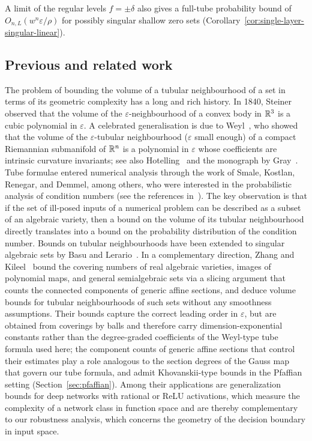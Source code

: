 A limit of the regular levels $f=\pm\delta$ also gives a full-tube probability bound of $O_{n,L}(w^n\varepsilon/\rho)$ for possibly singular shallow zero sets (Corollary~\ref{cor:single-layer-singular-linear}).

\subsection{Previous and related work}
The problem of bounding the volume of a tubular neighbourhood of a set in terms of its geometric complexity has a long and rich history. In 1840, Steiner~\cite{steiner1840bestimmung} observed that the volume of the $\varepsilon$-neighbourhood of a convex body in $\mathbb{R}^3$ is a cubic polynomial in $\varepsilon$. A celebrated generalisation is due to Weyl~\cite{weyl1939volume}, who showed that the volume of the $\varepsilon$-tubular neighbourhood ($\varepsilon$ small enough) of a compact Riemannian submanifold of $\mathbb{R}^n$ is a polynomial in $\varepsilon$ whose coefficients are intrinsic curvature invariants; see also Hotelling~\cite{hotelling1939tubes} and the monograph by Gray~\cite{gray2004tubes}. Tube formulae entered numerical analysis through the work of Smale, Kostlan, Renegar, and Demmel, among others, who were interested in the probabilistic analysis of condition numbers (see the references in~\cite{burgisser2013condition,lotz2015volume,basu2021hausdorff}). The key observation is that if the set of ill-posed inputs of a numerical problem can be described as a subset of an algebraic variety, then a bound on the volume of its tubular neighbourhood directly translates into a bound on the probability distribution of the condition number.
Bounds on tubular neighbourhoods have been extended to singular algebraic sets by Basu and Lerario~\cite{basu2021hausdorff}.
In a complementary direction, Zhang and Kileel~\cite{zhang2025covering} bound the covering numbers of real algebraic varieties, images of polynomial maps, and general semialgebraic sets via a slicing argument that counts the connected components of generic affine sections, and deduce volume bounds for tubular neighbourhoods of such sets without any smoothness assumptions. Their bounds capture the correct leading order in $\varepsilon$, but are obtained from coverings by balls and therefore carry dimension-exponential constants rather than the degree-graded coefficients of the Weyl-type tube formula used here; the component counts of generic affine sections that control their estimates play a role analogous to the section degrees of the Gauss map that govern our tube formula, and admit Khovanskii-type bounds in the Pfaffian setting (Section~\ref{sec:pfaffian}). Among their applications are generalization bounds for deep networks with rational or ReLU activations, which measure the complexity of a network class in function space and are thereby complementary to our robustness analysis, which concerns the geometry of the decision boundary in input space.

